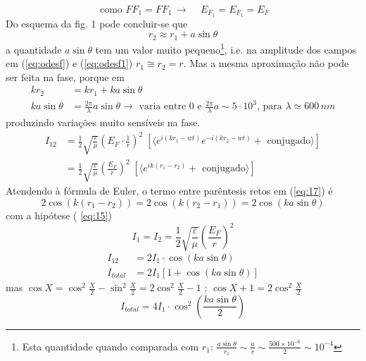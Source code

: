 \documentclass[a4paper,12pt]{article}
\begin{document}
\begin{equation}
	\label{eq:15} \text{ como } F F_1 = F F_1 \, \to \, \quad E_{F_1} = E_{F_1} = E_{F} 
\end{equation}
Do esquema da fig. 1 pode concluir-se que 
\begin{equation}
	\label{eq:16} r_2 \approx r_1 + a \sin \theta 
\end{equation}
a quantidade $ a \sin \theta $ tem um valor muito pequeno\footnote{Esta quantidade quando comparada com $ r_1$: \; $ \frac{a \sin \theta }{r_1 } \sim \frac{a}{r } \sim \frac{ 500 \times 10^{-6} }{2 } \sim 10^{-4}$},
i.e. na amplitude dos campos em (\ref{eq:odesf}) e (\ref{eq:odesf1}) $ r_1 \cong r_2 = r$. 
Mas a mesma aproximação não pode ser feita na fase, porque em 
\begin{align}
	k r_2 &= k r_1 +k a \sin \theta  \nonumber \\ %
	k a \sin \theta &= \frac{ 2 \pi }{\lambda } a \sin \theta  \rightarrow \text{ varia entre } 0 \text{ e } \frac{ 2 \pi}{\lambda} a \sim 5 \cdot 10^{3} \text{, para }  \lambda \simeq 600\,nm  \nonumber 
\end{align}
produzindo variações muito sensíveis na fase. 
\begin{align}
	\label{eq:17} I_{12} &=\frac{1}{2}\sqrt{\frac{ \varepsilon}{\mu}} \left(E_{F} \cdot \frac{1}{r }\right)^2 \; \left[ \langle e^{ i (k r_1 -wt )} e^{ -i (k r_2 -wt ) } + \text{ conjugado} \rangle \right] \nonumber \\
	&= \frac{1}{2}\sqrt{\frac{ \varepsilon}{\mu}} \left(\frac{E_F}{r }\right)^2 \; \left[ \langle e^{ i k (r_1 - r_2) } + \text{ conjugado} \rangle \right] 
\end{align}
Atendendo à fórmula de Euler, o termo entre parêntesis retos  em (\ref{eq:17}) é 
\begin{equation*}
	2 \cos ( k (r_1 - r_2) ) = 2 \cos ( k (r_2 - r_1) ) = 2 \cos ( k a \sin \theta ) 
\end{equation*}
com a hipótese ( \ref{eq:15}) 
\begin{equation}
	\label{eq:18} I_1= I_2 = \frac{1}{2}\sqrt{\frac{ \varepsilon}{\mu}} (\frac{E_F}{r })^2 
\end{equation}
\begin{align}
	I_{12} &= 2 I_1 \cdot \cos ( k a \sin \theta ) \\
	I_{total} &= 2 I_1 \left[ 1 + \cos ( k a \sin \theta ) \right ] 
\end{align}
mas $ \cos X = \cos^2 \frac{X}{2} - \sin^2 \frac{X}{2} = 2 \cos^2 \frac{X}{2} - 1$ ; $ \cos X +1 = 2 \cos^2 \frac{X}{2}$
\begin{equation}
	\label{eq:21} I_{total} = 4 I_1 \cdot  \cos^2 (\frac{k a \sin \theta }{2} ) 
\end{equation}
\end{document}
